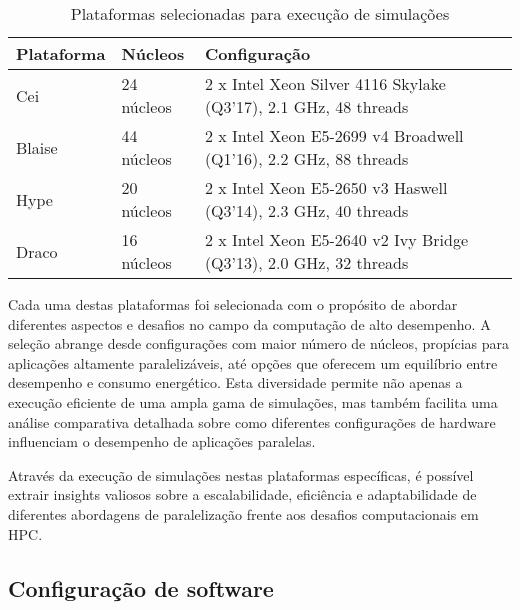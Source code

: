\documentclass[ppgc,diss]{iiufrgs}
\begin{document}
\begin{table}[h]
	\caption{Plataformas selecionadas para execução de simulações}
	\begin{center}
		\begin{tabular}{l|l|l}
			\textbf{Plataforma} & \textbf{Núcleos} & \textbf{Configuração} \\
			\hline
			\hline
			Cei & 24 núcleos & 2 x Intel Xeon Silver 4116 Skylake (Q3'17), 2.1 GHz, 48 threads \\
			\hline
			Blaise & 44 núcleos & 2 x Intel Xeon E5-2699 v4 Broadwell (Q1'16), 2.2 GHz, 88 threads \\
			\hline
			Hype & 20 núcleos & 2 x Intel Xeon E5-2650 v3 Haswell (Q3'14), 2.3 GHz, 40 threads \\
			\hline
			Draco & 16 núcleos & 2 x Intel Xeon E5-2640 v2 Ivy Bridge (Q3'13), 2.0 GHz, 32 threads \\
			\hline
		\end{tabular}
	\end{center}
	\label{tbl:plataformas_simulacao}
\end{table}

Cada uma destas plataformas foi selecionada com o propósito de abordar diferentes aspectos e desafios no campo da computação de alto desempenho. A seleção abrange desde configurações com maior número de núcleos, propícias para aplicações altamente paralelizáveis, até opções que oferecem um equilíbrio entre desempenho e consumo energético. Esta diversidade permite não apenas a execução eficiente de uma ampla gama de simulações, mas também facilita uma análise comparativa detalhada sobre como diferentes configurações de hardware influenciam o desempenho de aplicações paralelas.

Através da execução de simulações nestas plataformas específicas, é possível extrair insights valiosos sobre a escalabilidade, eficiência e adaptabilidade de diferentes abordagens de paralelização frente aos desafios computacionais em HPC.

\subsection{Configuração de software}




\end{document}
